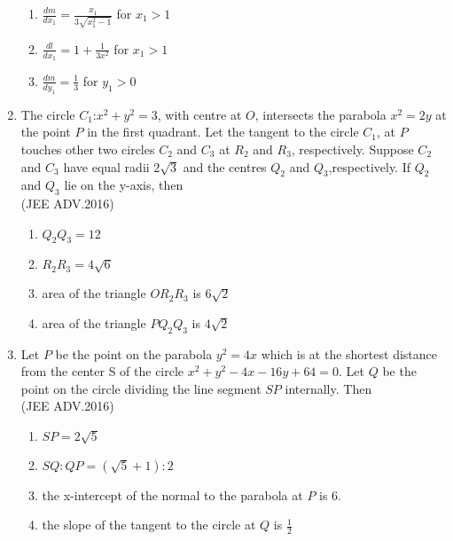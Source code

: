 \documentclass[journal,12pt,twocolumn]{IEEEtran}
\theoremstyle{remark}
\begin{document}
\begin{enumerate}
\begin{enumerate}
		      \item $\frac{dm}{dx_1}=\frac{x_1}{3\sqrt{x_1^2-1}}$ for $x_1>1$ 
		      \item $\frac{dl}{dx_1}=1+\frac{1}{3x^2}$ for $x_1>1$
		      \item $\frac{dm}{dy_1}=\frac{1}{3}$ for $y_1>0$ 
	      \end{enumerate}
      \item The circle $C_1$:$x^2+y^2=3$, with centre at $O$, intersects the parabola $x^2=2y$ at the point $P$ in the first quadrant. Let the tangent to the circle $C_1$, at $P$ touches other two circles $C_2$ and $C_3$ at $R_2$ and $R_3$, respectively. Suppose $C_2$ and $C_3$ have equal radii $2\sqrt{3}$ and the centres $Q_2$ and $Q_3$,respectively. If $Q_2$ and $Q_3$ lie on the y-axis, then \\ 
	      \hfill(JEE ADV.2016)
	      \\
	      \begin{enumerate}
		      \item $Q_2Q_3=12$
		      \item $R_2R_3=4\sqrt{6}$
		      \item area of the triangle $OR_2R_3$ is $6\sqrt{2}$
		      \item area of the triangle $PQ_2Q_3$ is $4\sqrt{2}$
	      \end{enumerate}
      \item Let $P$ be the point on the parabola $y^2=4x$ which is at the shortest distance from the center S of the circle $x^2+y^2-4x-16y+64=0$. Let $Q$ be the point on the circle
	      dividing the line segment $SP$ internally. Then \\
	      \hfill(JEE ADV.2016)
	      \\
	      \begin{enumerate}
		      \item $SP=2\sqrt{5}$
		      \item $SQ:QP=(\sqrt{5}+1):2$
		      \item the x-intercept of the normal to the parabola at $P$ is 6.
		      \item the slope of the tangent to the circle at $Q$ is $\frac{1}{2}$
		      

\end{enumerate}
\end{enumerate}
\end{document}
